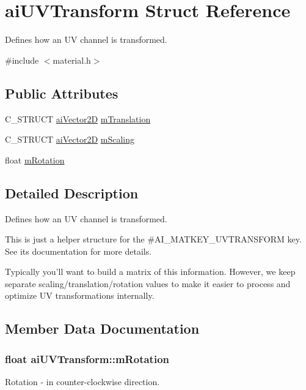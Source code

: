 \hypertarget{structai_u_v_transform}{\section{ai\-U\-V\-Transform Struct Reference}
\label{structai_u_v_transform}
}


Defines how an U\-V channel is transformed.  




{\ttfamily \#include $<$material.\-h$>$}

\subsection*{Public Attributes}
\begin{DoxyCompactItemize}
\item 
C\-\_\-\-S\-T\-R\-U\-C\-T \hyperlink{structai_vector2_d}{ai\-Vector2\-D} \hyperlink{structai_u_v_transform_a8c7f35959aa342bf0cef670246fbb813}{m\-Translation}
\item 
C\-\_\-\-S\-T\-R\-U\-C\-T \hyperlink{structai_vector2_d}{ai\-Vector2\-D} \hyperlink{structai_u_v_transform_a89429a027cbf914e7212e48149a957c8}{m\-Scaling}
\item 
float \hyperlink{structai_u_v_transform_aa8dcf39ccd39f786b3f5f163bd663792}{m\-Rotation}
\end{DoxyCompactItemize}


\subsection{Detailed Description}
Defines how an U\-V channel is transformed. 

This is just a helper structure for the \#\-A\-I\-\_\-\-M\-A\-T\-K\-E\-Y\-\_\-\-U\-V\-T\-R\-A\-N\-S\-F\-O\-R\-M key. See its documentation for more details.

Typically you'll want to build a matrix of this information. However, we keep separate scaling/translation/rotation values to make it easier to process and optimize U\-V transformations internally. 

\subsection{Member Data Documentation}
\hypertarget{structai_u_v_transform_aa8dcf39ccd39f786b3f5f163bd663792}{
\subsubsection[{m\-Rotation}]{\setlength{\rightskip}{0pt plus 5cm}float ai\-U\-V\-Transform\-::m\-Rotation}}\label{structai_u_v_transform_aa8dcf39ccd39f786b3f5f163bd663792}
Rotation -\/ in counter-\/clockwise direction.

